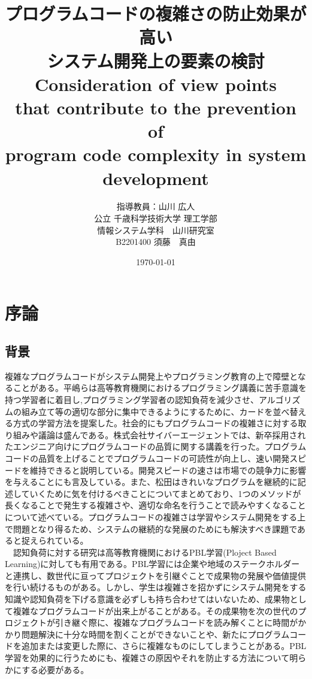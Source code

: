 \documentclass[12pt, a4paper]{jreport}
\begin{document}
    \title{プログラムコードの複雑さの防止効果が高い\\システム開発上の要素の検討\\Consideration of view points\\that contribute to the prevention of\\program code complexity in system development}
    \author{指導教員：山川 広人\\
    公立 千歳科学技術大学 理工学部\\
    情報システム学科　山川研究室\\
B2201400 須藤　真由}
\date{\today}

\maketitle
{}
\tableofcontents
\chapter{序論}

\section{背景}
複雑なプログラムコードがシステム開発上やプログラミング教育の上で障壁となることがある。平嶋ら\cite{haikei}は高等教育機関におけるプログラミング講義に苦手意識を持つ学習者に着目し,プログラミング学習者の認知負荷を減少させ、アルゴリズムの組み立て等の適切な部分に集中できるようにするために、カードを並べ替える方式の学習方法を提案した。社会的にもプログラムコードの複雑さに対する取り組みや議論は盛んである。株式会社サイバーエージェント\cite{CyberZ}では、新卒採用されたエンジニア向けにプログラムコードの品質に関する講義を行った。プログラムコードの品質を上げることでプログラムコードの可読性が向上し、速い開発スピードを維持できると説明している。開発スピードの速さは市場での競争力に影響を与えることにも言及している。また、松田\cite{kireina}はきれいなプログラムを継続的に記述していくために気を付けるべきことについてまとめており、1つのメソッドが長くなることで発生する複雑さや、適切な命名を行うことで読みやすくなることについて述べている。プログラムコードの複雑さは学習やシステム開発をする上で問題となり得るため、システムの継続的な発展のためにも解決すべき課題であると捉えられている。
\\　認知負荷に対する研究は高等教育機関におけるPBL学習(Ploject Based Learning)に対しても有用である。PBL学習には企業や地域のステークホルダーと連携し、数世代に亘ってプロジェクトを引継ぐことで成果物の発展や価値提供を行い続けるものがある。しかし、学生は複雑さを招かずにシステム開発をする知識や認知負荷を下げる意識を必ずしも持ち合わせてはいないため、成果物として複雑なプログラムコードが出来上がることがある。その成果物を次の世代のプロジェクトが引き継ぐ際に、複雑なプログラムコードを読み解くことに時間がかかり問題解決に十分な時間を割くことができないことや、新たにプログラムコードを追加または変更した際に、さらに複雑なものにしてしまうことがある。PBL学習を効果的に行うためにも、複雑さの原因やそれを防止する方法について明らかにする必要がある。
\end{document}
